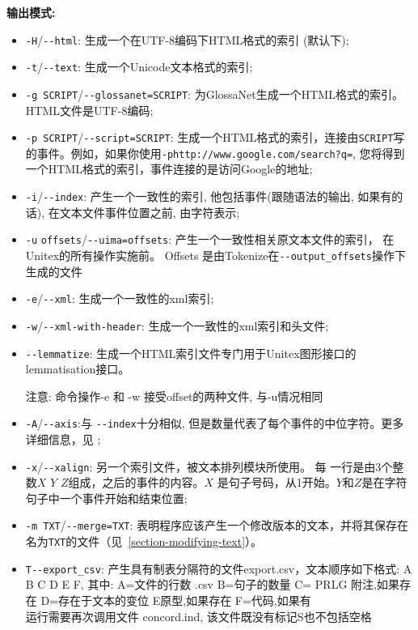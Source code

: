 \bigskip
\noindent \textbf{输出模式:}
\begin{itemize}
  \item \verb+-H+/\verb+--html+: 生成一个在UTF-8编码下HTML格式的索引 (默认下);
  \item \verb+-t+/\verb+--text+: 生成一个Unicode文本格式的索引; 
  \item \verb+-g SCRIPT+/\verb+--glossanet=SCRIPT+: 为GlossaNet生成一个HTML格式的索引。
 HTML文件是UTF-8编码;
  \item \verb+-p SCRIPT+/\verb+--script=SCRIPT+: 生成一个HTML格式的索引，连接由\verb+SCRIPT+写的事件。例如，如果你使用\verb$-phttp://www.google.com/search?q=$, 您将得到一个HTML格式的索引，事件连接的是访问Google的地址;

\item \verb+-i+/\verb+--index+: 产生一个一致性的索引, 他包括事件(跟随语法的输出, 如果有的话), 在文本文件事件位置之前, 由字符表示;
\item \verb+-u+ \verb+offsets+/\verb+--uima=offsets+: 产生一个一致性相关原文本文件的索引，
在Unitex的所有操作实施前。 Offsets 是由Tokenize在\verb+--output_offsets+操作下生成的文件

\item \verb+-e+/\verb+--xml+: 生成一个一致性的xml索引;
\item \verb+-w+/\verb+--xml-with-header+: 生成一个一致性的xml索引和头文件;
\item \verb+--lemmatize+: 生成一个HTML索引文件专门用于Unitex图形接口的lemmatisation接口。



	注意: 命令操作-e 和 -w 接受offset的两种文件, 与-u情况相同
	
\item \verb+-A+/\verb+--axis+:与 \verb+--index+十分相似, 但是数量代表了每个事件的中位字符。更多详细信息，见 \cite{axis};

\item \verb+-x+/\verb+--xalign+: 另一个索引文件，被文本排列模块所使用。 每
一行是由3个整数$X$ $Y$ $Z$组成，之后的事件的内容。$X$
是句子号码，从1开始。$Y$和$Z$是在字符句子中一个事件开始和结束位置;

\item \verb+-m TXT+/\verb+--merge=TXT+: 表明程序应该产生一个修改版本的文本，并将其保存在名为\verb+TXT+的文件（见~\ref{section-modifying-text}）。
 
\item  \verb+T--export_csv+: 产生具有制表分隔符的文件export.csv，文本顺序如下格式:
	\subitem A B C D E F, 其中:
	\subitem  A=文件的行数 .csv
	\subitem  B=句子的数量
	\subitem  C= PRLG 附注,如果存在
	\subitem  D=存在于文本的变位
	\subitem  E原型,如果存在
	\subitem  F=代码,如果有\\
	运行需要再次调用文件 concord.ind, 该文件既没有标记{S}也不包括空格
\end{itemize}

